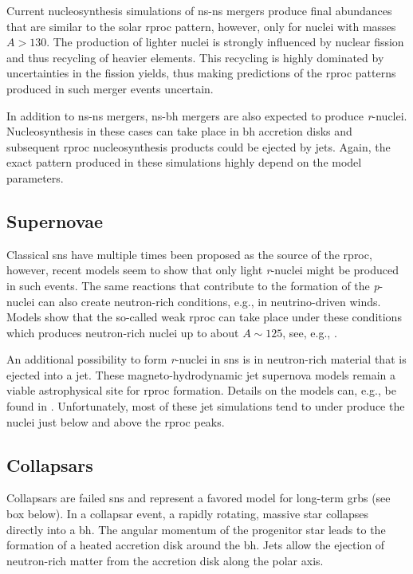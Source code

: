 Current nucleosynthesis simulations of \ac{ns}-\ac{ns} mergers produce final abundances that are similar to the solar \ac{rproc} pattern, however, only for nuclei with masses $A>130$. The production of lighter nuclei is strongly influenced by nuclear fission and thus recycling of heavier elements. This recycling is highly dominated by uncertainties in the fission yields, thus making predictions of the \ac{rproc} patterns produced in such merger events uncertain.

In addition to \ac{ns}-\ac{ns} mergers, \ac{ns}-\ac{bh} mergers are also expected to produce \textit{r}-nuclei. Nucleosynthesis in these cases can take place in \ac{bh} accretion disks and subsequent \ac{rproc} nucleosynthesis products could be ejected by jets. Again, the exact pattern produced in these simulations highly depend on the model parameters.

\subsection{Supernovae}

Classical \acp{sn} have multiple times been proposed as the source of the \ac{rproc}, however, recent models seem to show that only light \textit{r}-nuclei might be produced in such events. The same reactions that contribute to the formation of the \textit{p}-nuclei can also create neutron-rich conditions, e.g., in neutrino-driven winds. Models show that the so-called weak \ac{rproc} can take place under these conditions which produces neutron-rich nuclei up to about $A\sim125$, see, e.g., \citet{shibagaki16}.

An additional possibility to form \textit{r}-nuclei in \acp{sn} is in neutron-rich material that is ejected into a jet. These magneto-hydrodynamic jet supernova models remain a viable astrophysical site for \ac{rproc} formation. Details on the models can, e.g., be found in \citet{winteler12}. Unfortunately, most of these jet simulations tend to under produce the nuclei just below and above the \ac{rproc} peaks.

\subsection{Collapsars}
Collapsars are failed \acp{sn} and represent a favored model for long-term \acp{grb} (see box below). In a collapsar event, a rapidly rotating, massive star collapses directly into a \ac{bh}. The angular momentum of the progenitor star leads to the formation of a heated accretion disk around the \ac{bh}. Jets allow the ejection of neutron-rich matter from the accretion disk along the polar axis. 

